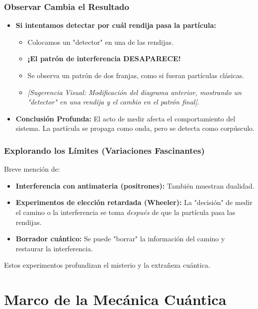 \documentclass{beamer}
\begin{document}
	\begin{frame}
		\frametitle{Observar Cambia el Resultado}
		\begin{itemize}
			\item \textbf{Si intentamos detectar por cuál rendija pasa la partícula:}
			\begin{itemize}
				\item Colocamos un "detector" en una de las rendijas.
				\item \textbf{¡El patrón de interferencia DESAPARECE!}
				\item Se observa un patrón de dos franjas, como si fueran partículas clásicas.
				\item \textit{[Sugerencia Visual: Modificación del diagrama anterior, mostrando un "detector" en una rendija y el cambio en el patrón final]}.
			\end{itemize} \pause
			\item \textbf{Conclusión Profunda:} El acto de medir afecta el comportamiento del sistema. La partícula se propaga como onda, pero se detecta como corpúsculo.
		\end{itemize}
	\end{frame}
	
	\begin{frame}
		\frametitle{Explorando los Límites (Variaciones Fascinantes)}
		Breve mención de:
		\begin{itemize}
			\item \textbf{Interferencia con antimateria (positrones):} También muestran dualidad. \pause
			\item \textbf{Experimentos de elección retardada (Wheeler):} La "decisión" de medir el camino o la interferencia se toma \textit{después} de que la partícula pasa las rendijas. \pause
			\item \textbf{Borrador cuántico:} Se puede "borrar" la información del camino y restaurar la interferencia.
		\end{itemize}
		\pause
		Estos experimentos profundizan el misterio y la extrañeza cuántica.
	\end{frame}
	
	\section{Marco de la Mecánica Cuántica}
	
\end{document}

